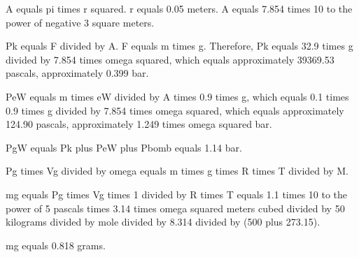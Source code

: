 A equals pi times r squared. r equals 0.05 meters. A equals 7.854 times 10 to the power of negative 3 square meters.

Pk equals F divided by A. F equals m times g. Therefore, Pk equals 32.9 times g divided by 7.854 times omega squared, which equals approximately 39369.53 pascals, approximately 0.399 bar.

PeW equals m times eW divided by A times 0.9 times g, which equals 0.1 times 0.9 times g divided by 7.854 times omega squared, which equals approximately 124.90 pascals, approximately 1.249 times omega squared bar.

PgW equals Pk plus PeW plus Pbomb equals 1.14 bar.

Pg times Vg divided by omega equals m times g times R times T divided by M.

mg equals Pg times Vg times 1 divided by R times T equals 1.1 times 10 to the power of 5 pascals times 3.14 times omega squared meters cubed divided by 50 kilograms divided by mole divided by 8.314 divided by (500 plus 273.15).

mg equals 0.818 grams.